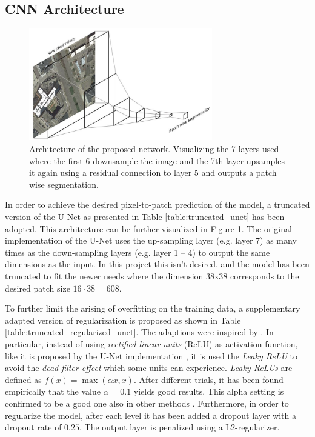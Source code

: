 \documentclass[10pt,conference,compsocconf]{IEEEtran}
\begin{document}
\subsection{CNN Architecture}\label{architectures}

\begin{figure}
\includegraphics[width={8cm}]{network-visualisation}
\caption{Architecture of the proposed network. Visualizing the 7 layers used where the first 6 downsample the image and the 7th layer upsamples it again using a residual connection to layer 5 and outputs a patch wise segmentation.}
\label{fig:architecture}
\end{figure}

In order to achieve the desired pixel-to-patch prediction of the model, a truncated version of the U-Net \cite{Ronneberger2015} as presented in Table \ref{table:truncated_unet} has been adopted. This architecture can be further visualized in Figure \ref{fig:architecture}. The original implementation of the U-Net uses the up-sampling layer (e.g. layer 7) as many times as the down-sampling layers (e.g. layer 1 – 4) to output the same dimensions as the input. In this project this isn't desired, and the model has been truncated to fit the newer needs where the dimension 38x38 corresponds to the desired patch size $16 \cdot 38 = 608$.

To further limit the arising of overfitting on the training data, a supplementary adapted version of regularization is proposed as shown in Table \ref{table:truncated_regularized_unet}. The adaptions were inspired by \cite{Pavllo2017}. In particular, instead of using \textit{rectified linear units} (ReLU) as activation function, like it is proposed by the U-Net implementation \cite{Ronneberger2015}, it is used the \textit{Leaky ReLU} to avoid the \textit{dead filter effect} which some units can experience. \textit{Leaky ReLUs} are defined as $f(x) = \max(\alpha x, x)$. After different trials, it has been found empirically that the value $\alpha=0.1$ yields good results. This alpha setting is confirmed to be a good one also in other methods \cite{Pavllo2017}. Furthermore, in order to regularize the model, after each level it has been added a dropout layer with a dropout rate of $0.25$. The output layer is penalized using a L2-regularizer.
\end{document}
